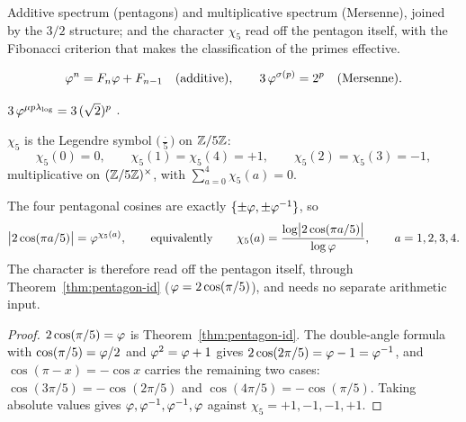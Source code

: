 Additive spectrum (pentagons) and multiplicative spectrum (Mersenne), joined by the $3/2$
structure; and the character $\chi_5$ read off the pentagon itself, with the Fibonacci criterion
that makes the classification of the primes effective.

\begin{equation}\label{eq:additive-mult}
\varphi^n=F_n\varphi+F_{n-1}\quad(\text{additive}),\qquad
3\,\varphi^{\sigma(p)}=2^{p}\quad(\text{Mersenne}).
\end{equation}

\begin{proposition}\label{prop:mersenne-med}
$3\,\varphi^{\mu p\lambda_{\log}}=3\,(\sqrt2)^{p}$ .
\end{proposition}

\begin{definition}\label{def:chi5}
$\chi_5$ is the Legendre symbol $\bigl(\tfrac{\cdot}{5}\bigr)$ on $\mathbb{Z}/5\mathbb{Z}$:
\begin{equation}\label{eq:chi5-values}
  \chi_5(0)=0,\qquad \chi_5(1)=\chi_5(4)=+1,\qquad \chi_5(2)=\chi_5(3)=-1,
\end{equation}
multiplicative on $(\mathbb{Z}/5\mathbb{Z})^{\times}$, with $\sum_{a=0}^{4}\chi_5(a)=0$.


\end{definition}

\begin{proposition}\label{prop:pentagon-chi5}
The four pentagonal cosines are exactly $\{\pm\varphi,\pm\varphi^{-1}\}$, so
\begin{equation}\label{eq:chi5-pentagon}
  \bigl|2\cos(\pi a/5)\bigr|=\varphi^{\chi_5(a)},
  \qquad\text{equivalently}\qquad
  \chi_5(a)=\frac{\log\bigl|2\cos(\pi a/5)\bigr|}{\log\varphi},
  \qquad a=1,2,3,4 .
\end{equation}
The character is therefore read off the pentagon itself, through
Theorem~\ref{thm:pentagon-id} ($\varphi=2\cos(\pi/5)$), and needs no separate arithmetic input.

\end{proposition}
\begin{proof}
$2\cos(\pi/5)=\varphi$ is Theorem~\ref{thm:pentagon-id}. The double-angle formula with
$\cos(\pi/5)=\varphi/2$ and $\varphi^{2}=\varphi+1$ gives
$2\cos(2\pi/5)=\varphi-1=\varphi^{-1}$, and $\cos(\pi-x)=-\cos x$ carries the remaining two
cases: $\cos(3\pi/5)=-\cos(2\pi/5)$ and $\cos(4\pi/5)=-\cos(\pi/5)$. Taking absolute values gives
$\varphi,\varphi^{-1},\varphi^{-1},\varphi$ against $\chi_5=+1,-1,-1,+1$.
\end{proof}

